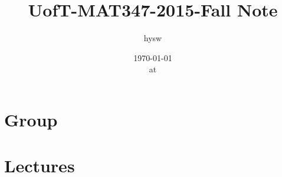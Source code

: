 \documentclass[letterpaper,twocolumn]{article}
\title{UofT-MAT347-2015-Fall Note}
\author{hysw}
\date{\today\\ at \currenttime}
\theoremstyle{definition}
\begin{document}
\maketitle

\tableofcontents

\section{Group}
\section{Lectures}



% 
% 
% 
%
%
% 
%
% 
% 
% 
% 
% 
% 
% 
% 
% 
% 
% 
% 
% 
\end{document}
